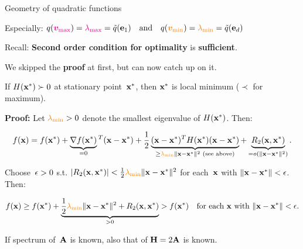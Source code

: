 \documentclass[11pt,compress,t,notes=noshow, xcolor=table]{beamer}
\begin{document}
\begin{vbframe}{Geometry of quadratic functions}
\begin{itemize}
\begin{footnotesize}
            Especially: $q(\textcolor{magenta}{\bm{v}_\text{max}}) = \textcolor{magenta}{\lambda_\text{max}} = \tilde{q}(\mathbf{e}_1) \quad\text{and}\quad q(\textcolor{orange}{\bm{v}_\text{min}}) = \textcolor{orange}{\lambda_\text{min}} = \tilde{q}(\mathbf{e}_d)$
        \end{footnotesize}
\end{itemize}

Recall: \textbf{Second order condition for optimality} is \textbf{sufficient}.

\medskip

We skipped the \textbf{proof} at first, but can now catch up on it.

\begin{kframe}
    \footnotesize
     If $H(\mathbf{x}^\ast) \succ 0$ at stationary point~$\mathbf{x}^\ast$, then $\mathbf{x}^\ast$ is local minimum ($\prec$ for maximum).

     \medskip

    \textbf{Proof:}
    Let $\textcolor{orange}{\lambda_\text{min}}>0$ denote the smallest eigenvalue of $H(\mathbf{x}^\ast)$.
    Then:
    
    \vspace{-1.25\baselineskip}
    
    \begin{equation*}
        f(\mathbf{x}) = f(\mathbf{x}^\ast) + \underbrace{\nabla f(\mathbf{x}^\ast)}_{=0}{}^T(\mathbf{x}-\mathbf{x}^\ast) + \frac{1}{2}\underbrace{(\mathbf{x}-\mathbf{x}^\ast)^T H(\mathbf{x}^\ast)(\mathbf{x}-\mathbf{x}^\ast)}_{\geq \textcolor{orange}{\lambda_\text{min}} \|\mathbf{x}-\mathbf{x}^\ast\|^2 \text{ (see above)}} + \underbrace{R_2(\mathbf{x},\mathbf{x}^\ast)}_{=o(\|\mathbf{x}-\mathbf{x}^\ast\|^2)}.
    \end{equation*}

    Choose~$\epsilon>0$ s.t. $|R_2(\mathbf{x},\mathbf{x}^\ast)| < \frac{1}{2} \textcolor{orange}{\lambda_\text{min}} \|\mathbf{x}-\mathbf{x}^\ast\|^2$ for each~$\mathbf{x}$ with $\|\mathbf{x}-\mathbf{x}^\ast\|<\epsilon$.
    Then:

    \vspace{-1.25\baselineskip}

    \begin{equation*}
        f(\mathbf{x}) \geq f(\mathbf{x}^\ast) + \underbrace{\frac{1}{2} \textcolor{orange}{\lambda_\text{min}} \|\mathbf{x}-\mathbf{x}^\ast\|^2 + R_2(\mathbf{x},\mathbf{x}^\ast)}_{>0} > f(\mathbf{x}^\ast) \quad\text{for each $\mathbf{x}$ with $\|\mathbf{x}-\mathbf{x}^\ast\|<\epsilon$}.
    \end{equation*}
\end{kframe}

\framebreak

If spectrum of~$\mathbf{A}$ is known, also that of $\mathbf{H} = 2\mathbf{A}$ is known.


\end{vbframe}
\end{document}
